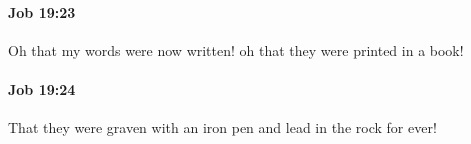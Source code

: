 		\paragraph{Job 19:23} %
			\label{JOB-19-23}

			Oh that my words were now written! oh that they were printed in a book!


		\paragraph{Job 19:24} %
			\label{JOB-19-24}

			That they were graven with an iron pen and lead in the rock for ever!


